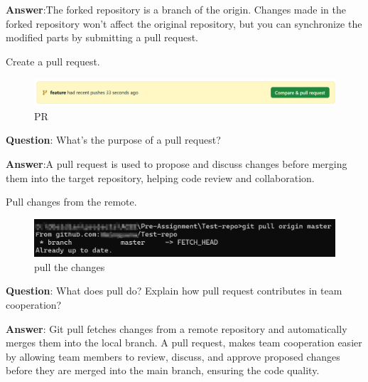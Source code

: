 \textbf{Answer}:The forked repository is a branch of the origin. Changes made in the forked repository won't affect the original repository, but you can synchronize the modified parts by submitting a pull request.

Create a pull request.
\begin{figure}[H]
\centering
\includegraphics[width = \textwidth]{./figures/PR2.png}
\caption{PR}
\end{figure}
\textbf{Question}: What's the purpose of a pull request?

\textbf{Answer}:A pull request is used to propose and discuss changes before merging them into the target repository, helping code review and collaboration.

Pull changes from the remote.
\begin{figure}[H]
\centering
\includegraphics[width = \textwidth]{./figures/pull.png}
\caption{pull the changes}
\end{figure}
\textbf{Question}: What does pull do? Explain how pull request contributes in team cooperation?

\textbf{Answer}: Git pull fetches changes from a remote repository and automatically merges them into the local branch.
A pull request, makes team cooperation easier by allowing team members to review, discuss, and approve proposed changes before they are merged into the main branch,
ensuring the code quality.